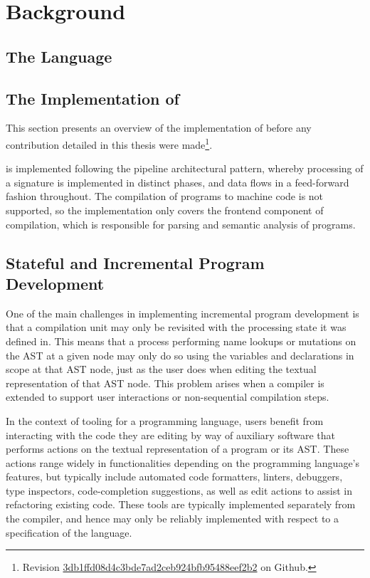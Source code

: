 \chapter{Background}

\section{The \Beluga Language}

\section{The Implementation of \Beluga}

This section presents an overview of the implementation of \Beluga before any contribution detailed in this thesis were made\footnote{Revision \href{https://github.com/Beluga-lang/Beluga/tree/4769323d701722bde42a0e2570d892ef78cd2d04}{3db1ffd08d4c3bde7ad2ceb924bfb95488eef2b2} on Github.}.

\Beluga is implemented following the pipeline architectural pattern, whereby processing of a \Beluga signature is implemented in distinct phases, and data flows in a feed-forward fashion throughout.
The compilation of \Beluga programs to machine code is not supported, so the implementation only covers the frontend component of compilation, which is responsible for parsing and semantic analysis of programs.


\section{Stateful and Incremental Program Development}

One of the main challenges in implementing incremental program development is that a compilation unit may only be revisited with the processing state it was defined in.
This means that a process performing name lookups or mutations on the \ac{AST} at a given node may only do so using the variables and declarations in scope at that \ac{AST} node, just as the user does when editing the textual representation of that \ac{AST} node.
This problem arises when a compiler is extended to support user interactions or non-sequential compilation steps.

In the context of tooling for a programming language, users benefit from interacting with the code they are editing by way of auxiliary software that performs actions on the textual representation of a program or its \ac{AST}.
These actions range widely in functionalities depending on the programming language's features, but typically include automated code formatters, linters, debuggers, type inspectors, code-completion suggestions, as well as edit actions to assist in refactoring existing code.
These tools are typically implemented separately from the compiler, and hence may only be reliably implemented with respect to a specification of the language.

